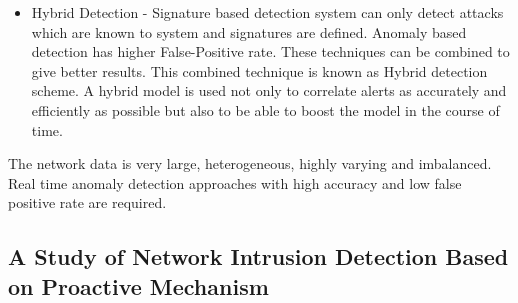 \documentclass[11pt]{article}
\begin{document}
\begin{itemize}
		\item Hybrid Detection - Signature based detection system can only detect attacks which are known to system and signatures are defined. Anomaly based detection has higher False-Positive rate. These techniques can be combined to give better results. This combined technique is known as Hybrid detection scheme. A hybrid model is used not only to correlate alerts as accurately and efficiently as possible but also to be able to boost the model in the course of time.
	\end{itemize}
The network data is very large, heterogeneous, highly varying and imbalanced. Real time anomaly detection approaches with high accuracy and low false positive rate are required.
	
	\subsection{A Study of Network Intrusion Detection Based on Proactive Mechanism}
	
\end{document}
